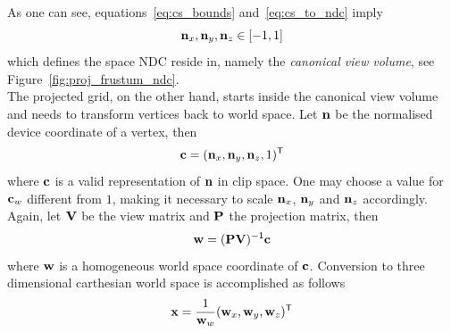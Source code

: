 %
%
As one can see, equations~\ref{eq:cs_bounds}
and~\ref{eq:cs_to_ndc} imply
\begin{equation}
\label{eq:ndc_bounds}
 \mvecx{n}, \mvecy{n}, \mvecz{n} \in \interval{-1}{1}
\end{equation}
which defines the space NDC reside in, namely the \textit{canonical view volume},
see Figure~\ref{fig:proj_frustum_ndc}.\\


The projected grid, on the other hand, starts inside the canonical view volume
and needs to transform vertices back to world space. Let $\mathbf{n}$ be the
normalised device coordinate of a vertex, then
\begin{equation}
\label{eq:ndc_to_cs}
 \mathbf{c} = (\mathbf{n}_x, \mathbf{n}_y, \mathbf{n}_z, 1)^{\mathsf{T}}
\end{equation}
where $\mathbf{c}$ is a valid representation of $\mathbf{n}$ in clip space. One may choose
a value for $\mathbf{c}_w$ different from $1$, making it necessary to scale $\mathbf{n}_x$,
$\mathbf{n}_y$ and $\mathbf{n}_z$ accordingly. Again, let $\mathbf{V}$ be the view matrix and
$\mathbf{P}$ the projection matrix, then
\begin{equation}
\label{eq:cs_to_wsh}
 \mathbf{w} = (\mathbf{P} \mathbf{V})^{\mathsf{-1}} \mathbf{c}
\end{equation}
where $\mathbf{w}$ is a homogeneous world space coordinate of $\mathbf{c}$. Conversion
to three dimensional carthesian world space is accomplished as follows
\begin{equation}
\label{eq:wsh_to_ws}
 \mathbf{x} = \frac{1}{\mathbf{w}_w}(\mathbf{w}_x, \mathbf{w}_y, \mathbf{w}_z)^{\mathsf{T}}
\end{equation}

